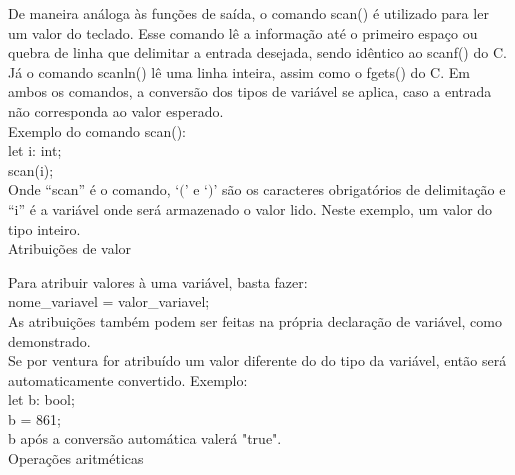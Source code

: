 \documentclass[12pt,a4paper]{article}
\begin{document}
De maneira análoga às funções de saída, o comando scan() é utilizado para ler um valor do teclado. Esse comando lê a informação até o primeiro espaço ou quebra de linha que delimitar a entrada desejada, sendo idêntico ao scanf() do C. Já o comando scanln() lê uma linha inteira, assim como o fgets() do C. Em ambos os comandos, a conversão dos tipos de variável se aplica, caso a entrada não corresponda ao valor esperado.\\

Exemplo do comando scan(): \\

let i: int;\\

scan(i);\\

Onde ``scan'' é o comando, `$($' e `$)$' são os caracteres obrigatórios de delimitação e ``i'' é a variável onde será armazenado o valor lido. Neste exemplo, um valor do tipo inteiro.\\


\hypertarget{label2}{\Large{Atribuições de valor}}\\[0.3cm]
\normalsize

Para atribuir valores à uma variável, basta fazer: \\

nome\_variavel = valor\_variavel; \\

As atribuições também podem ser feitas na própria declaração de variável, como demonstrado. \\

Se por ventura for atribuído um valor diferente do do tipo da variável, então será automaticamente convertido. Exemplo:\\

let b: bool; \\

b = 861;\\

b após a conversão automática valerá "true".\\

\hypertarget{label3}{\Large{Operações aritméticas}}\\[0.3cm]
\normalsize
\end{document}
